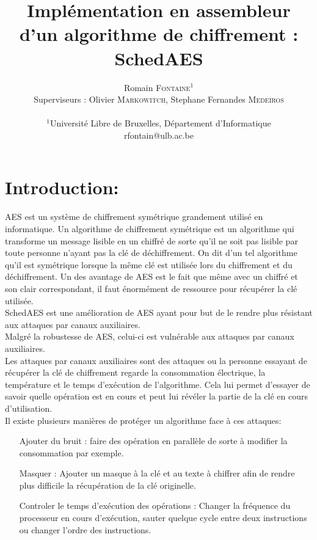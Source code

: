 \documentclass[letterpaper]{article}
\author{Romain \textsc{Fontaine}$^{1}$\\
    Superviseurs : Olivier \textsc{Markowitch}, Stephane Fernandes \textsc{Medeiros}\\
    \mbox{}\\
    $^1$Université Libre de Bruxelles, Département d’Informatique \\
    rfontain@ulb.ac.be
}
\title{Implémentation en assembleur d'un algorithme de chiffrement :\\ SchedAES}
\date{}
\begin{document}
\maketitle

\section{Introduction:}
AES est un système de chiffrement symétrique grandement utilisé en informatique.
Un algorithme de chiffrement symétrique est un algorithme qui transforme un message lisible en un chiffré de sorte qu'il ne soit pas lisible par toute personne n'ayant pas la clé de déchiffrement.
On dit d'un tel algorithme qu'il est symétrique lorsque la même clé est utilisée lors du chiffrement et du déchiffrement. Un des avantage de AES est le fait que même avec un chiffré et son clair correspondant, il faut énormément de ressource pour récupérer la clé utilisée.\\




SchedAES est une amélioration de AES ayant pour but de le rendre plus résistant aux attaques par canaux auxiliaires.\\

Malgré la robustesse de AES, celui-ci est vulnérable aux attaques par canaux auxiliaires.\\

Les attaques par canaux auxiliaires sont des attaques ou la personne essayant de récupérer la clé de chiffrement regarde la consommation électrique, la température et le temps d'exécution de l'algorithme.
Cela lui permet d'essayer de savoir quelle opération est en cours et peut lui révéler la partie de la clé en cours d'utilisation.\\

Il existe plusieurs manières de protéger un algorithme face à ces attaques:
\begin{itemize}
    \item[Ajouter du bruit :] faire des opération en parallèle de sorte à modifier la consommation par exemple.
    \item[Masquer :] Ajouter un masque à la clé et au texte à chiffrer afin de rendre plus difficile la récupération de la clé originelle.
    \item[Controler le temps d'exécution des opérations :] Changer la fréquence du processeur en cours d'exécution, sauter quelque cycle entre deux instructions ou changer l'ordre des instructions.\\
\end{itemize}
\end{document}
